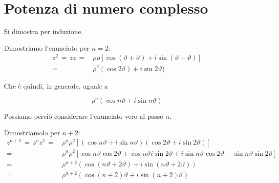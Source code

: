 \documentclass[../../dimostrazioni]{subfiles}
\begin{document}
        \newpage

        \section*{Potenza di numero complesso}

            Si dimostra per induzione.
            
            \medskip

            Dimostriamo l'enunciato per \(n = 2\):
            \begin{align*}
                z^2 \, = \, zz \, =& \, \rho\rho [\cos(\vartheta + \vartheta) + i\sin(\vartheta+\vartheta)] \\
                                  =& \, \rho^2(\cos2\vartheta)+ i\sin2\vartheta)
            \end{align*}

            Che è quindi, in generale, uguale a

            \[\rho^n (\cos n\vartheta +i\sin n\vartheta)\]

            Possiamo perciò considerare l'enunciato vero al passo \(n\).

            \medskip

            Dimostriamolo per \(n + 2\):
            \begin{align*}
                z^{n+2} \, = \, z^n z^2 \, =& \, \rho^n \rho^2 [(\cos n\vartheta + i\sin n\vartheta)(\cos 2\vartheta + i\sin 2\vartheta)] \\
                                           =& \, \rho^n \rho^2 [\cos n\vartheta\cos2\vartheta + \cos n\vartheta i\sin2\vartheta + i\sin n\vartheta \cos2\vartheta - \sin n\vartheta \sin2\vartheta] \\
                                           =& \, \rho^{n+2} (\cos(n\vartheta + 2\vartheta) + i\sin(n\vartheta + 2\vartheta)) \\
                                           =& \, \rho^{n+2} (\cos(n+2)\vartheta + i\sin(n+2)\vartheta)
            \end{align*}
            
\end{document}
